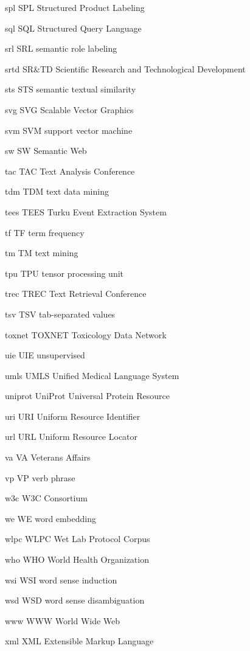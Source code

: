 \newabbreviation
{spl}
{SPL}
{Structured Product Labeling}

\newabbreviation
{sql}
{SQL}
{Structured Query Language}

\newabbreviation
{srl}
{SRL}
{semantic role labeling}

\newabbreviation
{srtd}
{SR\&TD}
{Scientific Research and Technological Development}

\newabbreviation
{sts}
{STS}
{semantic textual similarity}

\newabbreviation
{svg}
{SVG}
{Scalable Vector Graphics}

\newabbreviation
{svm}
{SVM}
{support vector machine}

\newabbreviation
{sw}
{SW}
{Semantic Web}

\newabbreviation
{tac}
{TAC}
{Text Analysis Conference}

\newabbreviation
{tdm}
{TDM}
{text data mining}

\newabbreviation
{tees}
{TEES}
{Turku Event Extraction System}

\newabbreviation
{tf}
{TF}
{term frequency}

\newabbreviation
{tm}
{TM}
{text mining}

\newabbreviation
{tpu}
{TPU}
{tensor processing unit}

\newabbreviation
{trec}
{TREC}
{Text Retrieval Conference}

\newabbreviation
{tsv}
{TSV}
{tab-separated values}

\newabbreviation
{toxnet}
{TOXNET}
{Toxicology Data Network}

\newabbreviation
{uie}
{UIE}
{unsupervised }

\newabbreviation
{umls}
{UMLS}
{Unified Medical Language System}

\newabbreviation
{uniprot}
{UniProt}
{Universal Protein Resource}

\newabbreviation
{uri}
{URI}
{Uniform Resource Identifier}

\newabbreviation
{url}
{URL}
{Uniform Resource Locator}

\newabbreviation
{va}
{VA}
{Veterans Affairs}

\newabbreviation
{vp}
{VP}
{verb phrase}

\newabbreviation
{w3c}
{W3C}
{ Consortium}

\newabbreviation
{we}
{WE}
{word embedding}

\newabbreviation
{wlpc}
{WLPC}
{Wet Lab Protocol Corpus}

\newabbreviation
{who}
{WHO}
{World Health Organization}

\newabbreviation
{wsi}
{WSI}
{word sense induction}

\newabbreviation
{wsd}
{WSD}
{word sense disambiguation}

\newabbreviation
{www}
{WWW}
{World Wide Web}

\newabbreviation
{xml}
{XML}
{Extensible Markup Language}
